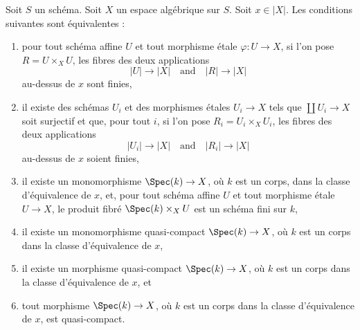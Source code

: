 \begin{lemma}
\label{lemma-UR-finite-above-x}
Soit $S$ un schéma. Soit $X$ un espace algébrique sur $S$.
Soit $x \in |X|$. Les conditions suivantes sont équivalentes :
\begin{enumerate}
\item pour tout schéma affine $U$ et tout morphisme étale
$\varphi : U \to X$, si l'on pose $R = U \times_X U$, les fibres des deux
applications
$$
|U| \longrightarrow |X|
\quad\text{and}\quad
|R| \longrightarrow |X|
$$
au-dessus de $x$ sont finies,
\item il existe des schémas $U_i$ et des morphismes étales
$U_i \to X$ tels que $\coprod U_i \to X$ soit surjectif et que, pour tout
$i$, si l'on pose $R_i = U_i \times_X U_i$, les fibres des deux applications
$$
|U_i| \longrightarrow |X|
\quad\text{and}\quad
|R_i| \longrightarrow |X|
$$
au-dessus de $x$ soient finies,
\item il existe un monomorphisme $\Spec(k) \to X$, où $k$ est un corps,
dans la classe d'équivalence de $x$, et, pour tout schéma affine $U$ et tout
morphisme étale $U \to X$, le produit fibré $\Spec(k) \times_X U$ est
un schéma fini sur $k$,
\item il existe un monomorphisme quasi-compact $\Spec(k) \to X$,
où $k$ est un corps dans la classe d'équivalence de $x$,
\item il existe un morphisme quasi-compact $\Spec(k) \to X$,
où $k$ est un corps dans la classe d'équivalence de $x$, et
\item tout morphisme $\Spec(k) \to X$, où $k$ est un corps dans la
classe d'équivalence de $x$, est quasi-compact.
\end{enumerate}
\end{lemma}

